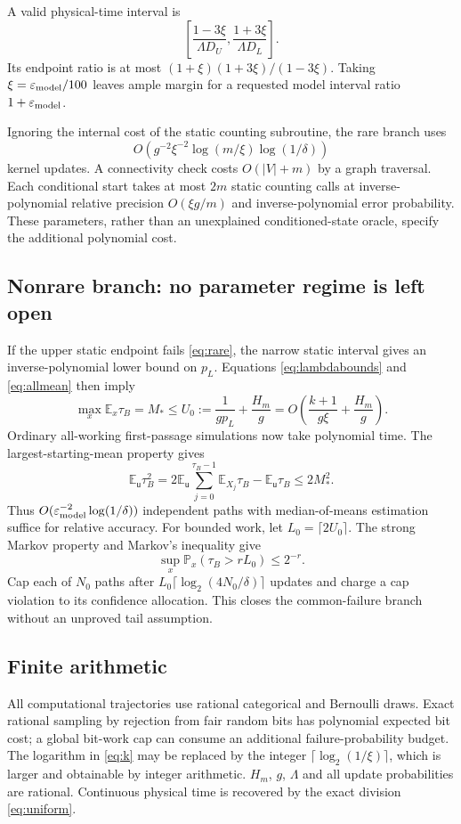 \documentclass[11pt,a4paper]{article}
\newcommand{\E}{\mathbb E}
\newcommand{\Pp}{\mathbb P}
\newcommand{\up}{\mathsf u}
\begin{document}
A valid physical-time interval is
\begin{equation}
 \boxed{\left[\frac{1-3\xi}{\Lambda D_U},
                 \frac{1+3\xi}{\Lambda D_L}\right].}\label{eq:output}
\end{equation}
Its endpoint ratio is at most $(1+\xi)(1+3\xi)/(1-3\xi)$. Taking $\xi=\varepsilon_{\rm model}/100$ leaves ample margin for a requested model interval ratio $1+\varepsilon_{\rm model}$.

Ignoring the internal cost of the static counting subroutine, the rare branch uses
\[
 O\!\left(g^{-2}\xi^{-2}\log(m/\xi)\log(1/\delta)\right)
\]
kernel updates. A connectivity check costs $O(|V|+m)$ by a graph traversal. Each conditional start takes at most $2m$ static counting calls at inverse-polynomial relative precision $O(\xi g/m)$ and inverse-polynomial error probability. These parameters, rather than an unexplained conditioned-state oracle, specify the additional polynomial cost.

\subsection{Nonrare branch: no parameter regime is left open}
If the upper static endpoint fails \eqref{eq:rare}, the narrow static interval gives an inverse-polynomial lower bound on $p_L$. Equations \eqref{eq:lambdabounds} and \eqref{eq:allmean} then imply
\begin{equation}
 \max_x\E_x\tau_B=M_*\le U_0:=\frac1{gp_L}+\frac{H_m}{g}
 =O\!\left(\frac{k+1}{g\xi}+\frac{H_m}{g}\right).\label{eq:common}
\end{equation}
Ordinary all-working first-passage simulations now take polynomial time. The largest-starting-mean property gives
\[
 \E_{\up}\tau_B^2
 =2\E_{\up}\sum_{j=0}^{\tau_B-1}\E_{X_j}\tau_B-\E_{\up}\tau_B
 \le2M_*^2.
\]
Thus $O(\varepsilon_{\rm model}^{-2}\log(1/\delta))$ independent paths with median-of-means estimation suffice for relative accuracy. For bounded work, let $L_0=\lceil2U_0\rceil$. The strong Markov property and Markov's inequality give
\[
 \sup_x\Pp_x(\tau_B>rL_0)\le2^{-r}.
\]
Cap each of $N_0$ paths after $L_0\lceil\log_2(4N_0/\delta)\rceil$ updates and charge a cap violation to its confidence allocation. This closes the common-failure branch without an unproved tail assumption.

\subsection{Finite arithmetic}
All computational trajectories use rational categorical and Bernoulli draws. Exact rational sampling by rejection from fair random bits has polynomial expected bit cost; a global bit-work cap can consume an additional failure-probability budget. The logarithm in \eqref{eq:k} may be replaced by the integer $\lceil\log_2(1/\xi)\rceil$, which is larger and obtainable by integer arithmetic. $H_m$, $g$, $\Lambda$ and all update probabilities are rational. Continuous physical time is recovered by the exact division \eqref{eq:uniform}.
\end{document}
